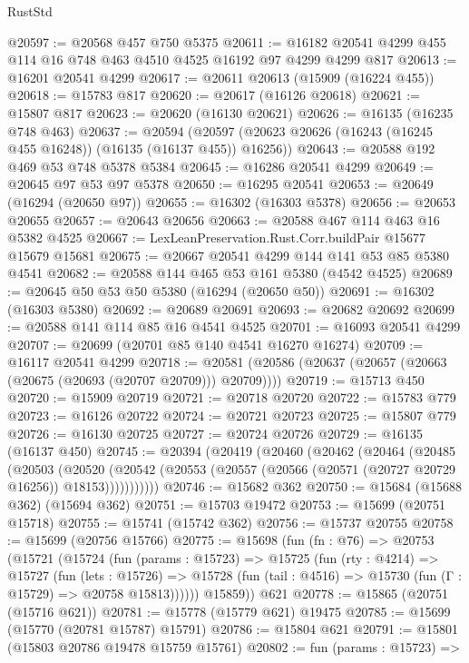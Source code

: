 \begin{lexlean}{RustStd}
\begin{coremodule}
@20597 := @20568 @457 @750 @5375
@20611 := @16182 @20541 @4299 @455 @114 @16 @748 @463 @4510 @4525 @16192 @97 @4299 @4299 @817
@20613 := @16201 @20541 @4299
@20617 := @20611 @20613 (@15909 (@16224 @455))
@20618 := @15783 @817
@20620 := @20617 (@16126 @20618)
@20621 := @15807 @817
@20623 := @20620 (@16130 @20621)
@20626 := @16135 (@16235 @748 @463)
@20637 := @20594
    (@20597 (@20623 @20626 (@16243 (@16245 @455 @16248)) (@16135 (@16137 @455)) @16256))
@20643 := @20588 @192 @469 @53 @748 @5378 @5384
@20645 := @16286 @20541 @4299
@20649 := @20645 @97 @53 @97 @5378
@20650 := @16295 @20541
@20653 := @20649 (@16294 (@20650 @97))
@20655 := @16302 (@16303 @5378)
@20656 := @20653 @20655
@20657 := @20643 @20656
@20663 := @20588 @467 @114 @463 @16 @5382 @4525
@20667 := LexLeanPreservation.Rust.Corr.buildPair @15677 @15679 @15681
@20675 := @20667 @20541 @4299 @144 @141 @53 @85 @5380 @4541
@20682 := @20588 @144 @465 @53 @161 @5380 (@4542 @4525)
@20689 := @20645 @50 @53 @50 @5380 (@16294 (@20650 @50))
@20691 := @16302 (@16303 @5380)
@20692 := @20689 @20691
@20693 := @20682 @20692
@20699 := @20588 @141 @114 @85 @16 @4541 @4525
@20701 := @16093 @20541 @4299
@20707 := @20699 (@20701 @85 @140 @4541 @16270 @16274)
@20709 := @16117 @20541 @4299
@20718 := @20581 (@20586 (@20637 (@20657 (@20663 (@20675 (@20693 (@20707 @20709))) @20709))))
@20719 := @15713 @450
@20720 := @15909 @20719
@20721 := @20718 @20720
@20722 := @15783 @779
@20723 := @16126 @20722
@20724 := @20721 @20723
@20725 := @15807 @779
@20726 := @16130 @20725
@20727 := @20724 @20726
@20729 := @16135 (@16137 @450)
@20745 := @20394
    (@20419
      (@20460
        (@20462
          (@20464
            (@20485
              (@20503
                (@20520
                  (@20542 (@20553 (@20557 (@20566 (@20571 (@20727 @20729 @16256)) @18153)))))))))))
@20746 := @15682 @362
@20750 := @15684 (@15688 @362) (@15694 @362)
@20751 := @15703 @19472
@20753 := @15699 (@20751 @15718)
@20755 := @15741 (@15742 @362)
@20756 := @15737 @20755
@20758 := @15699 (@20756 @15766)
@20775 := @15698
    (fun (fn : @76) =>
    @20753
      (@15721
        (@15724
          (fun (params : @15723) =>
          @15725
            (fun (rty : @4214) =>
            @15727
              (fun (lets : @15726) =>
              @15728 (fun (tail : @4516) => @15730 (fun (Γ : @15729) => @20758 @15813))))))
        @15859))
    @621
@20778 := @15865 (@20751 (@15716 @621))
@20781 := @15778 (@15779 @621) @19475
@20785 := @15699 (@15770 (@20781 @15787) @15791)
@20786 := @15804 @621
@20791 := @15801 (@15803 @20786 @19478 @15759 @15761)
@20802 := fun (params : @15723) =>

\end{coremodule}
\end{lexlean}
